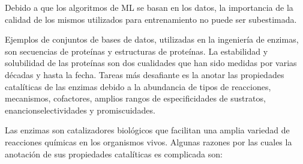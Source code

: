 \documentclass[12pt]{article}
\begin{document}
Debido a que los algoritmos de ML se basan en los datos, la importancia de la calidad de los mismos utilizados para entrenamiento no puede ser subestimada.

Ejemplos de conjuntos de bases de datos, utilizadas en la ingeniería de enzimas, son secuencias de proteínas y estructuras de proteínas. La estabilidad y solubilidad de las proteínas son dos cualidades que han sido medidas por varias décadas y hasta la fecha. Tareas más desafiante es la anotar las propiedades catalíticas de las enzimas debido a la abundancia de tipos de reacciones, mecanismos, cofactores, amplios rangos de especificidades de sustratos, enancionselectividades y promiscuidades.


Las enzimas son catalizadores biológicos que facilitan una amplia variedad de reacciones químicas en los organismos vivos. Algunas razones por las cuales la anotación de sus propiedades catalíticas es complicada son:
\end{document}
